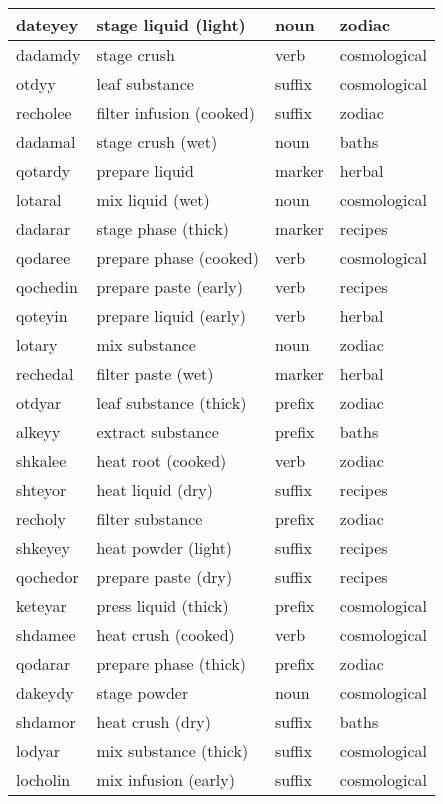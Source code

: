 \documentclass[12pt]{article}
\begin{document}
\begin{longtable}{|l|l|l|l|}
dateyey & stage liquid (light) & noun & zodiac \\ \hline
dadamdy & stage crush & verb & cosmological \\ \hline
otdyy & leaf substance & suffix & cosmological \\ \hline
recholee & filter infusion (cooked) & suffix & zodiac \\ \hline
dadamal & stage crush (wet) & noun & baths \\ \hline
qotardy & prepare liquid & marker & herbal \\ \hline
lotaral & mix liquid (wet) & noun & cosmological \\ \hline
dadarar & stage phase (thick) & marker & recipes \\ \hline
qodaree & prepare phase (cooked) & verb & cosmological \\ \hline
qochedin & prepare paste (early) & verb & recipes \\ \hline
qoteyin & prepare liquid (early) & verb & herbal \\ \hline
lotary & mix substance & noun & zodiac \\ \hline
rechedal & filter paste (wet) & marker & herbal \\ \hline
otdyar & leaf substance (thick) & prefix & zodiac \\ \hline
alkeyy & extract substance & prefix & baths \\ \hline
shkalee & heat root (cooked) & verb & zodiac \\ \hline
shteyor & heat liquid (dry) & suffix & recipes \\ \hline
recholy & filter substance & prefix & zodiac \\ \hline
shkeyey & heat powder (light) & suffix & recipes \\ \hline
qochedor & prepare paste (dry) & suffix & recipes \\ \hline
keteyar & press liquid (thick) & prefix & cosmological \\ \hline
shdamee & heat crush (cooked) & verb & cosmological \\ \hline
qodarar & prepare phase (thick) & prefix & zodiac \\ \hline
dakeydy & stage powder & noun & cosmological \\ \hline
shdamor & heat crush (dry) & suffix & baths \\ \hline
lodyar & mix substance (thick) & suffix & cosmological \\ \hline
locholin & mix infusion (early) & suffix & cosmological \\ \hline

\end{longtable}
\end{document}
